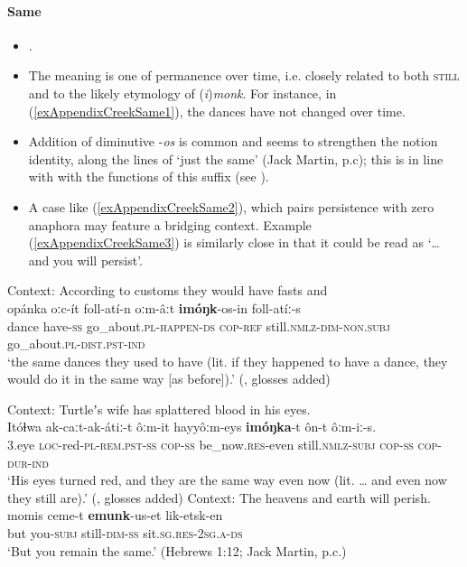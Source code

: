 \paragraph{Same}\label{appendixCreekSame}
\begin{itemize}
	\item \textcite[25]{MartinMcKaneMauldin2000}.
	\item The meaning is one of permanence over time, i.e. closely related to both \textsc{still} and to the likely etymology of \mbox{(\textit{i})\textit{monk}}. For instance, in (\ref{exAppendixCreekSame1}), the dances have not changed over time.
	\item Addition of diminutive -\textit{os} is common and seems to strengthen the notion identity, along the lines of \lq just the same' (Jack Martin, p.c); this is in line with with the functions of this suffix (see \cite[234–236]{Martin2011}).	
	\item A case like (\ref{exAppendixCreekSame2}), which pairs persistence with zero anaphora may feature a bridging context. Example (\ref{exAppendixCreekSame3}) is similarly close in that it could be read as \lq … and you will persist\rq{}.
\end{itemize}

\begin{exe}
	\ex \label{exAppendixCreekSame1}
	Context: According to customs they would have fasts and \\
	 \gll opánka oːc-ít  foll-atí-n oːm-âːt \textbf{imóŋk}-os-in foll-atíː-s\\
dance have-\textsc{ss} go\_about.\textsc{pl}-\textsc{happen}-\textsc{ds} \textsc{cop}-\textsc{ref} still.\textsc{nmlz}-\textsc{dim}-\textsc{non}.\textsc{subj} go\_about.\textsc{pl}-\textsc{dist.pst}-\textsc{ind}\\
	\glt \lq the same dances they used to have (lit. if they happened to have a dance, they would do it in the same way [as before]).\rq{ }(\cite[57–58]{HaasHill2014}, glosses added)

	\ex Context: Turtleʼs wife has splattered blood in his eyes.\label{exAppendixCreekSame2}
	\\
	\gll Itóɬwa 	ak-caːt-ak-átiː-t ôːm-it hayyôːm-eys \textbf{imóŋka}-t 	ôn-t ôːm-iː-s.\\
3.eye \textsc{loc}-red-\textsc{pl}-\textsc{rem}.\textsc{pst}-\textsc{ss} \textsc{cop}-\textsc{ss} be\_now.\textsc{res}-even still.\textsc{nmlz}-\textsc{subj} \textsc{cop}-\textsc{ss} \textsc{cop}-\textsc{dur}-\textsc{ind}\\
	\glt \lq His eyes turned red, and they are the same way even now (lit. … and even now they still are).\rq{ }(\cite[442]{HaasHill2014}, glosses added)
\pagebreak
\ex Context: The heavens and earth will perish.\label{exAppendixCreekSame3}\\
\gll momis  ceme-t \textbf{emunk}-us-et lik-etsk-en\\
but you-\textsc{subj} still-\textsc{dim}-\textsc{ss} sit.\textsc{sg}.\textsc{res}-2\textsc{sg}.\textsc{a}-\textsc{ds}\\
\glt \lq But you remain the same.' (Hebrews 1:12; Jack Martin, p.c.)
\end{exe}

